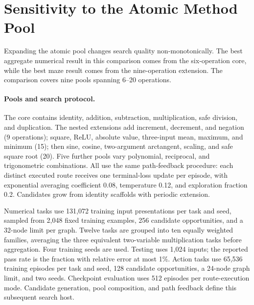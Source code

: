 \section{Sensitivity to the Atomic Method Pool}
\label{app:revision_pool}

Expanding the atomic pool changes search quality non-monotonically. The best
aggregate numerical result in this comparison comes from the six-operation
core, while the best maze result comes from the nine-operation extension.
The comparison covers nine pools spanning 6--20 operations.

\paragraph{Pools and search protocol.}
The core contains identity, addition, subtraction, multiplication, safe
division, and duplication. The nested extensions add increment, decrement,
and negation (9 operations); square, ReLU, absolute value, three-input mean,
maximum, and minimum (15); then sine, cosine, two-argument arctangent, scaling,
and safe square root (20). Five further pools vary polynomial, reciprocal,
and trigonometric combinations. All use the same path-feedback procedure:
each distinct executed route receives one terminal-loss update per episode,
with exponential averaging coefficient 0.08, temperature 0.12, and exploration
fraction 0.2. Candidates grow from identity scaffolds with periodic extension.

Numerical tasks use 131,072 training input presentations per task and seed,
sampled from 2,048 fixed training examples, 256 candidate opportunities, and a
32-node limit per graph. Twelve tasks are grouped into ten equally weighted
families, averaging the three equivalent two-variable multiplication tasks
before aggregation. Four training seeds are used. Testing uses 1,024 inputs;
the reported pass rate is the fraction with relative error at most 1\%.
Action tasks use 65,536 training episodes per task and seed, 128 candidate
opportunities, a 24-node graph limit, and two seeds. Checkpoint evaluation uses
512 episodes per route-execution mode. Candidate generation, pool composition,
and path feedback define this subsequent search host.

